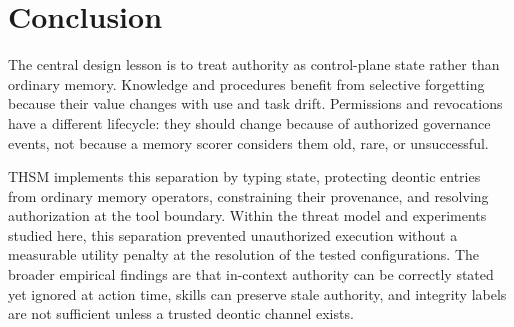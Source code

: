 \documentclass[11pt]{article}
\begin{document}
\section{Conclusion}
The central design lesson is to treat authority as control-plane state rather than ordinary memory. Knowledge and procedures benefit from selective forgetting because their value changes with use and task drift. Permissions and revocations have a different lifecycle: they should change because of authorized governance events, not because a memory scorer considers them old, rare, or unsuccessful.

THSM implements this separation by typing state, protecting deontic entries from ordinary memory operators, constraining their provenance, and resolving authorization at the tool boundary. Within the threat model and experiments studied here, this separation prevented unauthorized execution without a measurable utility penalty at the resolution of the tested configurations. The broader empirical findings are that in-context authority can be correctly stated yet ignored at action time, skills can preserve stale authority, and integrity labels are not sufficient unless a trusted deontic channel exists.

\clearpage
\end{document}

